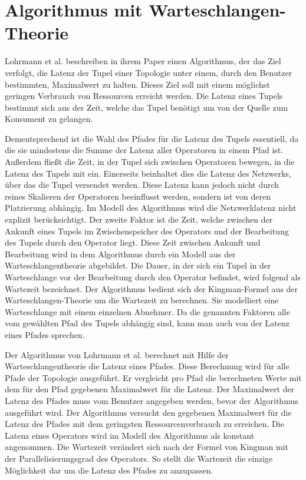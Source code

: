 \chapter{Algorithmus mit Warteschlangen-Theorie}

Lohrmann et al. beschreiben in ihrem Paper \cite{lohrmann_elastic_2015} einen Algorithmus, der das Ziel verfolgt, die Latenz der Tupel einer Topologie unter einem, durch den Benutzer bestimmten, Maximalwert zu halten.
Dieses Ziel soll mit einem möglichst geringen Verbrauch von Ressourcen erreicht werden.
Die Latenz eines Tupels bestimmt sich aus der Zeit, welche das Tupel benötigt um von der Quelle zum Konsument zu gelangen.

Dementsprechend ist die Wahl des Pfades für die Latenz des Tupels essentiell, da die sie mindestens die Summe der Latenz aller Operatoren in einem Pfad ist.
Außerdem fließt die Zeit, in der Tupel sich zwischen Operatoren bewegen, in die Latenz des Tupels mit ein.
Einerseits beinhaltet dies die Latenz des Netzwerks, über das die Tupel versendet werden.
Diese Latenz kann jedoch nicht durch reines Skalieren der Operatoren beeinflusst werden, sondern ist von deren Platzierung abhängig.
Im Modell des Algorithmus wird die Netzwerklatenz nicht explizit berücksichtigt.
Der zweite Faktor ist die Zeit, welche zwischen der Ankunft eines Tupels im Zwischenspeicher des Operators und der Bearbeitung des Tupels durch den Operator liegt.
Diese Zeit zwischen Ankunft und Bearbeitung wird in dem Algorithmus durch ein Modell aus der Warteschlangentheorie abgebildet.
Die Dauer, in der sich ein Tupel in der Warteschlange vor der Bearbeitung durch den Operator befindet, wird folgend als Wartezeit bezeichnet.
Der Algorithmus bedient sich der Kingman-Formel aus der Warteschlangen-Theorie um die Wartezeit zu berechnen.
Sie modelliert eine Warteschlange mit einem einzelnen Abnehmer.
Da die genannten Faktoren alle vom gewählten Pfad des Tupels abhängig sind, kann man auch von der Latenz eines Pfades sprechen.

Der Algorithmus von Lohrmann et al. berechnet mit Hilfe der Warteschlangentheorie die Latenz eines Pfades.
Diese Berechnung wird für alle Pfade der Topologie ausgeführt.
Er vergleicht pro Pfad die berechneten Werte mit dem für den Pfad gegebenen Maximalwert für die Latenz.
Der Maximalwert der Latenz des Pfades muss vom Benutzer angegeben werden, bevor der Algorithmus ausgeführt wird.
Der Algorithmus versucht den gegebenen Maximalwert für die Latenz des Pfades mit dem geringsten Ressourcenverbrauch zu erreichen.
Die Latenz eines Operators wird im Modell des Algorithmus als konstant angenommen. 
Die Wartezeit verändert sich nach der Formel von Kingman mit der Parallelisierungsgrad des Operators.
So stellt die Wartezeit die einzige Möglichkeit dar um die Latenz des Pfades zu anzupassen.

